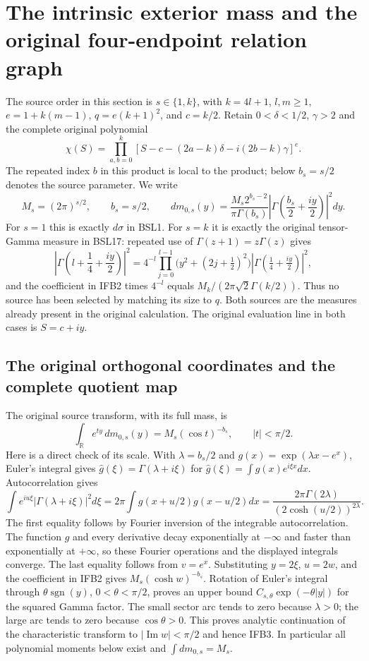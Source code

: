 \section{The intrinsic exterior mass and the original four-endpoint relation graph}
\label{sec:IFB}

The source order in this section is $s\in\{1,k\}$, with
$k=4l+1$, $l,m\geq1$, $e=1+k(m-1)$,
$q=e(k+1)^2$, and $c=k/2$.
Retain $0<\delta<1/2$, $\gamma>2$ and the complete original polynomial
\[
 \chi(S)=\prod_{a,b=0}^k
 [S-c-(2a-k)\delta-i(2b-k)\gamma]^e.
 \tag{IFB1}
\]
The repeated index $b$ in this product is local to the product; below
$b_s=s/2$ denotes the source parameter. We write
\[
 M_s=(2\pi)^{s/2},\qquad b_s=s/2,\qquad
 dm_{0,s}(y)=
 \frac{M_s2^{b_s-2}}{\pi\Gamma(b_s)}
 \left|\Gamma\left(\frac{b_s}{2}+\frac{iy}{2}\right)\right|^2dy.
 \tag{IFB2}
\]
For $s=1$ this is exactly $d\sigma$ in BSL1. For $s=k$ it is
exactly the original tensor-Gamma measure in BSL17: repeated use of
$\Gamma(z+1)=z\Gamma(z)$ gives
\[
 \left|\Gamma\left(l+\frac14+\frac{iy}{2}\right)\right|^2
 =4^{-l}\prod_{j=0}^{l-1}\bigl(y^2+(2j+\tfrac12)^2\bigr)
       |\Gamma(\tfrac14+\tfrac{iy}{2})|^2,
\]
and the coefficient in IFB2 times $4^{-l}$ equals
$M_k/(2\pi\sqrt2\Gamma(k/2))$. Thus no source has been selected
by matching its size to $q$. Both sources are the measures already
present in the original calculation. The original evaluation line in
both cases is $S=c+iy$.

\subsection{The original orthogonal coordinates and the complete quotient map}

The original source transform, with its full mass, is
\[
 \int_{\mathbb R}e^{ty}\,dm_{0,s}(y)
       =M_s(\cos t)^{-b_s},\qquad |t|<\pi/2.
 \tag{IFB3}
\]
Here is a direct check of its scale. With $\lambda=b_s/2$ and
$g(x)=\exp(\lambda x-e^x)$, Euler's integral gives
$\widehat g(\xi)=\Gamma(\lambda+i\xi)$ for
$\widehat g(\xi)=\int g(x)e^{i\xi x}dx$. Autocorrelation gives
\[
 \int e^{iu\xi}|\Gamma(\lambda+i\xi)|^2d\xi
 =2\pi\int g(x+u/2)g(x-u/2)dx
 =\frac{2\pi\Gamma(2\lambda)}{(2\cosh(u/2))^{2\lambda}}.
\]
The first equality follows by Fourier inversion of the integrable
autocorrelation. The function $g$ and every derivative decay
exponentially at $-\infty$ and faster than exponentially at $+\infty$,
so these Fourier operations and the displayed integrals converge.
The last equality follows from $v=e^x$. Substituting $y=2\xi$,
$u=2w$, and the coefficient in IFB2 gives
$M_s(\cosh w)^{-b_s}$. Rotation of Euler's integral through
$\theta\operatorname{sgn}(y)$, $0<\theta<\pi/2$, proves an
upper bound $C_{s,\theta}\exp(-\theta|y|)$ for the squared Gamma
factor. The small sector arc tends to zero because $\lambda>0$;
the large arc tends to zero because $\cos\theta>0$. This proves
analytic continuation of the characteristic transform to
$|\operatorname{Im}w|<\pi/2$ and hence IFB3. In particular all
polynomial moments below exist and $\int dm_{0,s}=M_s$.

